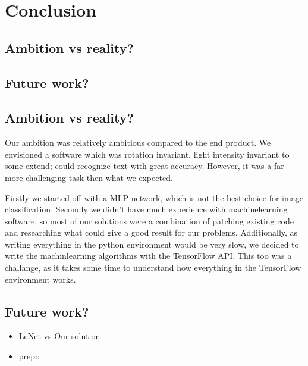 \documentclass[Report.tex]{subfiles}
\begin{document}
\chapter{Conclusion}
\label{chap:Conclusion}
\section{Ambition vs reality?}
\section{Future work?}


\section{Ambition vs reality?}
Our ambition was relatively ambitious compared to the end product. We envisioned
a software which was rotation invariant, light intensity invariant to some
extend; could recognize text with great accuracy. However, it was a far more
challenging task then what we expected. \par
Firstly we started off with a MLP network, which is not the best choice for
image classification. Secondly we didn't have much experience with
machinelearning software, so most of our solutions were a combination of
patching existing code and researching what could give a good result for
our problems. Additionally, as writing everything in the python environment
would be very slow, we decided to write the machinlearning algorithms with the
TensorFlow API. This too was a challange, as it takes some time to understand
how everything in the TensorFlow environment works.


\section{Future work?}

\begin{itemize}
  \item LeNet vs Our solution
  \item prepo
\end{itemize}
\end{document}
